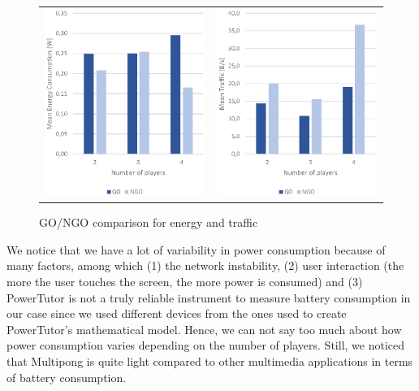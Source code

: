 \begin{figure}[H]
  \centering
  \begin{tabular}{@{}c@{}c}
      \includegraphics[width=.5\columnwidth]{img/energy.eps}
      \label{fig:energy}
    &
    \includegraphics[width=.5\columnwidth]{img/traffic.eps}
    \label{fig:traffic}
  \end{tabular}
  \caption{GO/NGO comparison for energy and traffic}\label{fig:comparison}
\end{figure}

We notice that we have a lot of variability in power consumption because of
many factors, among which (1) the network instability, (2) user interaction
(the more the user touches the screen, the more power is consumed) and (3)
PowerTutor is not a truly reliable instrument to measure battery consumption in
our case since we used different devices from the ones used to create
PowerTutor's mathematical model. Hence, we can not say too much about how power
consumption varies depending on the number of players. Still, we noticed that
Multipong is quite light compared to other multimedia applications in terms of
battery consumption.

